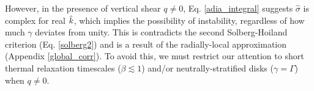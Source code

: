 
However, in the presence of vertical shear $q\neq0$,
Eq. \ref{adia_integral} suggests $\hat{\sigma}$ is complex for real
$\hat{k}$, which implies the possibility of instability, regardless of
how much $\gamma$ deviates from unity. This is contradicts the second 
Solberg-Hoiland criterion (Eq. \ref{solberg2}) and is a result of the
radially-local approximation (Appendix \ref{global_corr}). To 
avoid this, we must restrict our attention to short thermal relaxation
timescales ($\beta\lesssim1$) and/or neutrally-stratified disks
($\gamma=\Gamma$) when $q\neq0$. 




